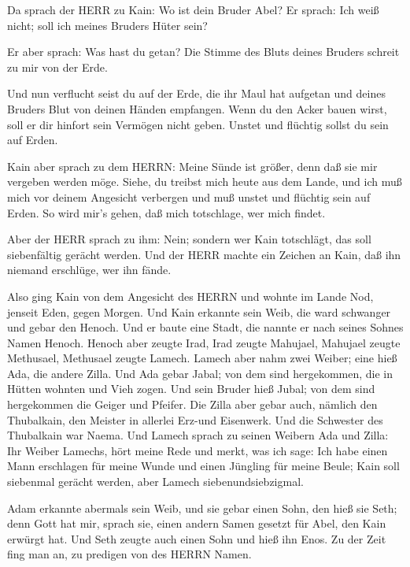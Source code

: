  Da sprach der HERR zu Kain: Wo ist dein Bruder Abel? Er
sprach: Ich weiß nicht; soll ich meines Bruders Hüter sein?

 Er aber sprach: Was hast du getan? Die Stimme des Bluts
deines Bruders schreit zu mir von der Erde.

 Und nun verflucht seist du auf der Erde, die ihr Maul hat
aufgetan und deines Bruders Blut von deinen Händen empfangen.
 Wenn du den Acker bauen wirst, soll er dir hinfort sein
Vermögen nicht geben. Unstet und flüchtig sollst du sein auf Erden.

 Kain aber sprach zu dem HERRN: Meine Sünde ist größer,
denn daß sie mir vergeben werden möge.  Siehe, du treibst
mich heute aus dem Lande, und ich muß mich vor deinem Angesicht
verbergen und muß unstet und flüchtig sein auf Erden. So wird mir's
gehen, daß mich totschlage, wer mich findet.

 Aber der HERR sprach zu ihm: Nein; sondern wer Kain
totschlägt, das soll siebenfältig gerächt werden. Und der HERR machte
ein Zeichen an Kain, daß ihn niemand erschlüge, wer ihn fände.

 Also ging Kain von dem Angesicht des HERRN und wohnte im
Lande Nod, jenseit Eden, gegen Morgen.  Und Kain erkannte
sein Weib, die ward schwanger und gebar den Henoch. Und er baute eine
Stadt, die nannte er nach seines Sohnes Namen Henoch. 
Henoch aber zeugte Irad, Irad zeugte Mahujael, Mahujael zeugte
Methusael, Methusael zeugte Lamech.  Lamech aber nahm zwei
Weiber; eine hieß Ada, die andere Zilla.  Und Ada gebar
Jabal; von dem sind hergekommen, die in Hütten wohnten und Vieh zogen.
 Und sein Bruder hieß Jubal; von dem sind hergekommen die
Geiger und Pfeifer.  Die Zilla aber gebar auch, nämlich den
Thubalkain, den Meister in allerlei Erz-und Eisenwerk. Und die Schwester
des Thubalkain war Naema.  Und Lamech sprach zu seinen
Weibern Ada und Zilla: Ihr Weiber Lamechs, hört meine Rede und merkt,
was ich sage: Ich habe einen Mann erschlagen für meine Wunde und einen
Jüngling für meine Beule;  Kain soll siebenmal gerächt
werden, aber Lamech siebenundsiebzigmal.

 Adam erkannte abermals sein Weib, und sie gebar einen
Sohn, den hieß sie Seth; denn Gott hat mir, sprach sie, einen andern
Samen gesetzt für Abel, den Kain erwürgt hat.  Und Seth
zeugte auch einen Sohn und hieß ihn Enos. Zu der Zeit fing man an, zu
predigen von des HERRN Namen.

